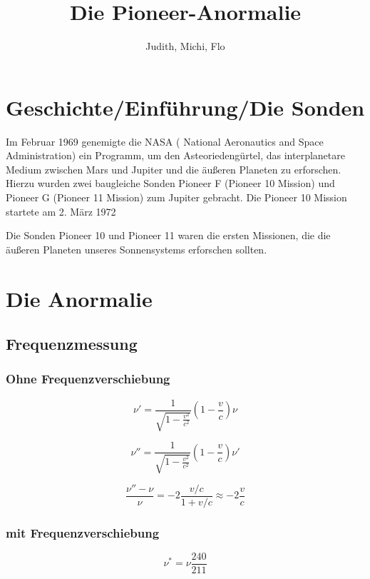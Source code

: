 \documentclass[a4paper,10pt]{article}
\title{Die Pioneer-Anormalie}
\author{Judith, Michi, Flo}
\begin{document}
\maketitle

% 

\section{Geschichte/Einführung/Die Sonden}
Im Februar 1969 genemigte die NASA ( National Aeronautics and Space Administration) ein Programm, um den Asteoriedengürtel,
das interplanetare Medium zwischen Mars und Jupiter und die äußeren Planeten zu erforschen.
Hierzu wurden zwei baugleiche Sonden Pioneer F (Pioneer 10 Mission) und Pioneer G (Pioneer 11 Mission) zum Jupiter gebracht.
Die Pioneer 10 Mission startete am 2. März 1972

Die Sonden Pioneer 10 und Pioneer 11 waren die ersten Missionen, die die äußeren Planeten unseres Sonnensystems erforschen sollten. 


\section{Die Anormalie}
\subsection{Frequenzmessung}

\subsubsection{Ohne Frequenzverschiebung}
\begin{equation}
 \nu' = \frac{1}{\sqrt{1-\frac{v^2}{c^2}}}(1-\frac{v}{c})\nu
\end{equation}

\begin{equation}
 \nu'' = \frac{1}{\sqrt{1-\frac{v^2}{c^2}}}(1-\frac{v}{c})\nu'
\end{equation}

\begin{equation}
 \frac{\nu''-\nu}{\nu} = -2\frac{v/c}{1+v/c} \approx -2 \frac{v}{c}
\end{equation}

\subsubsection{mit Frequenzverschiebung}
\begin{equation}
\nu^{*} = \nu\frac{240}{211}
\end{equation}
\end{document}
